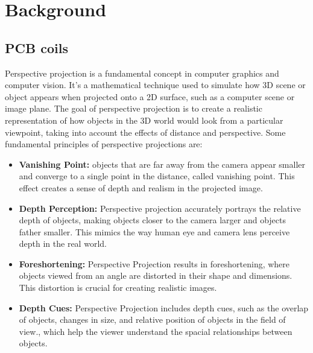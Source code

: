 
\chapter{Background} %

\label{Chapter2} %


\section{PCB coils}
\label{Chapter2/PerspProj}
Perspective projection is a fundamental concept in computer graphics and computer vision. It's a mathematical technique used to simulate how 3D scene or object appears when projected onto a 2D surface, such as a computer scene or image plane. The goal of perspective projection is to create a realistic representation of how objects in the 3D world would look from a particular viewpoint, taking into account the effects of distance and perspective. Some fundamental principles of perspective projections are:
\begin{itemize}
    \item\textbf{Vanishing Point:} objects that are far away from the camera appear smaller and converge to a single point in the distance, called vanishing point. This effect creates a sense of depth and realism in the projected image.
    \item\textbf{Depth Perception:} Perspective projection accurately portrays the relative depth of objects, making objects closer to the camera larger and objects father smaller. This mimics the way human eye and camera lens perceive depth in the real world.
    \item\textbf{Foreshortening:} Perspective Projection results in foreshortening, where objects viewed from an angle are distorted in their shape and dimensions. This distortion is crucial for creating realistic images.
    \item\textbf{Depth Cues:} Perspective Projection includes depth cues, such as the overlap of objects, changes in size, and relative position of objects in the field of view., which help the viewer understand the spacial relationships between objects.
\end{itemize}

